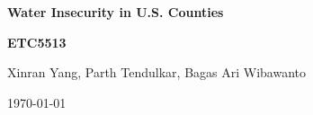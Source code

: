 \begin{titlepage}
    \centering
    \vspace*{\fill} 

    {\fontsize{36}{38}\selectfont\bfseries\color{monashblue} Water Insecurity in U.S. Counties \par}
    \vspace{1.5cm}

    {\fontsize{18}{20}\selectfont\bfseries  ETC5513 \par}
    \vspace{2cm}
    
    {\fontsize{18}{20}\selectfont Xinran Yang, Parth Tendulkar, Bagas Ari Wibawanto \par}
    \vspace{1cm}

    \vspace*{\fill} 
    
    {\large \today \par}
\end{titlepage}
\clearpage